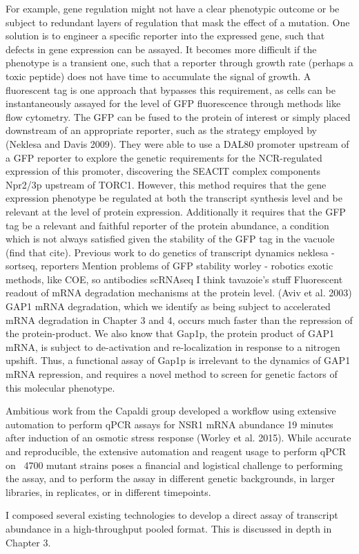 For example, gene regulation might not have a
clear phenotypic outcome or be subject to redundant layers of
regulation that mask the effect of a mutation. One solution is to
engineer a specific reporter into the expressed gene, such that
defects in gene expression can be assayed. It becomes more difficult
if the phenotype is a transient one, such that a reporter through
growth rate (perhaps a toxic peptide) does not have time to accumulate
the signal of growth. A fluorescent tag is one approach that bypasses
this requirement, as cells can be instantaneously assayed for the
level of GFP fluorescence through methods like flow cytometry. The GFP
can be fused to the protein of interest or simply placed downstream of
an appropriate reporter, such as the strategy employed by (Neklesa and
Davis 2009). They were able to use a DAL80 promoter upstream of a GFP
reporter to explore the genetic requirements for the NCR-regulated
expression of this promoter, discovering the SEACIT complex components
Npr2/3p upstream of TORC1. However, this method requires that the gene
expression phenotype be regulated at both the transcript synthesis
level and be relevant at the level of protein expression. Additionally
it requires that the GFP tag be a relevant and faithful reporter of
the protein abundance, a condition which is not always satisfied given
the stability of the GFP tag in the vacuole (find that cite).
Previous work to do genetics of transcript dynamics neklesa - sortseq,
reporters Mention problems of GFP stability worley - robotics exotic
methods, like COE, so antibodies scRNAseq I think tavazoie’s stuff
Fluorescent readout of mRNA degradation mechanisms at the protein
level. (Aviv et al. 2003) GAP1 mRNA degradation, which we identify as
being subject to accelerated mRNA degradation in Chapter 3 and 4,
occurs much faster than the repression of the protein-product. We also
know that Gap1p, the protein product of GAP1 mRNA, is subject to
de-activation and re-localization in response to a nitrogen upshift.
Thus, a functional assay of Gap1p is irrelevant to the dynamics of
GAP1 mRNA repression, and requires a novel method to screen for
genetic factors of this molecular phenotype.  

Ambitious work from the
Capaldi group developed a workflow using extensive automation to
perform qPCR assays for NSR1 mRNA abundance 19 minutes after induction
of an osmotic stress response (Worley et al. 2015). While accurate and
reproducible, the extensive automation and reagent usage to perform
qPCR on ~4700 mutant strains poses a financial and logistical
challenge to performing the assay, and to perform the assay in
different genetic backgrounds, in larger libraries, in replicates, or
in different timepoints.  

I composed several existing technologies to
develop a direct assay of transcript abundance in a high-throughput
pooled format. This is discussed in depth in Chapter 3. 

